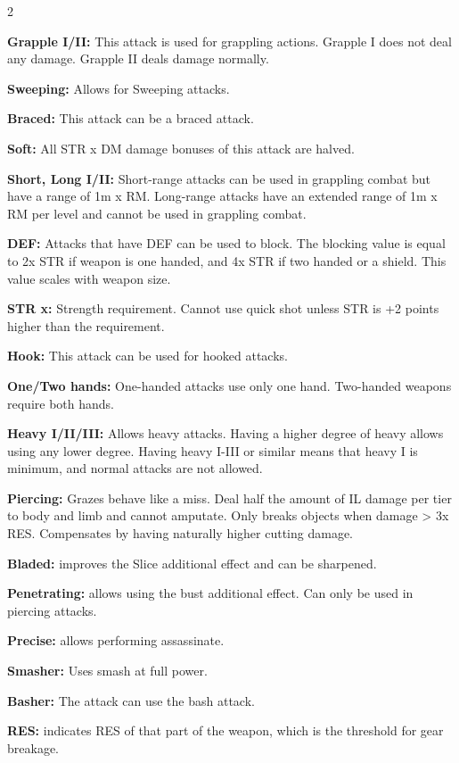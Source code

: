 \begin{multicols}{2}
\noindent
\begin{proplist}
\item \textbf{Grapple I/II:} This attack is used for grappling actions. Grapple I does not deal any damage. Grapple II deals damage normally.
\item \textbf{Sweeping:} Allows for Sweeping attacks.
\item \textbf{Braced:} This attack can be a braced attack.
\item \textbf{Soft:} All STR x DM damage bonuses of this attack are halved.
\item \textbf{Short, Long I/II:} Short-range attacks can be used in grappling combat but have a range of 1m x RM. Long-range attacks have an extended range of 1m x RM per level and cannot be used in grappling combat.  
\item \textbf{DEF:} Attacks that have DEF can be used to block. The blocking value is equal to 2x STR if weapon is one handed, and 4x STR if two handed or a shield. This value scales with weapon size.
\item \textbf{STR x:} Strength requirement. Cannot use quick shot unless STR is +2 points higher than the requirement.
\item \textbf{Hook:} This attack can be used for hooked attacks.
\item \textbf{One/Two hands:} One-handed attacks use only one hand. Two-handed weapons require both hands. 
\item \textbf{Heavy I/II/III:} Allows heavy attacks. Having a higher degree of heavy allows using any lower degree. Having heavy I-III or similar means that heavy I is minimum, and normal attacks are not allowed.
\item \textbf{Piercing:} Grazes behave like a miss. Deal half the amount of IL damage per tier to body and limb and cannot amputate. Only breaks objects when damage > 3x RES. Compensates by having naturally higher cutting damage.
\item \textbf{Bladed:} improves the Slice additional effect and can be sharpened.
\item \textbf{Penetrating:} allows using the bust additional effect. Can only be used in piercing attacks.
\item \textbf{Precise:} allows performing assassinate.
\item \textbf{Smasher:} Uses smash at full power.
\item \textbf{Basher:} The attack can use the bash attack.
\item \textbf{RES:} indicates RES of that part of the weapon, which is the threshold for gear breakage.

\end{proplist}
\end{multicols}
